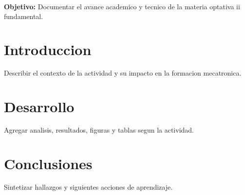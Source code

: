 \documentclass[spanish,letterpaper,oneside]{article}
\begin{document}
\templatePortrait
\templatePagecfg
\onehalfspacing

\begin{abstractd}
\textbf{Objetivo:} Documentar el avance academico y tecnico de la materia optativa ii fundamental.
\end{abstractd}

\templateIndex
\templateFinalcfg

\section{Introduccion}
Describir el contexto de la actividad y su impacto en la formacion mecatronica.

\section{Desarrollo}
Agregar analisis, resultados, figuras y tablas segun la actividad.

\section{Conclusiones}
Sintetizar hallazgos y siguientes acciones de aprendizaje.



\end{document}
